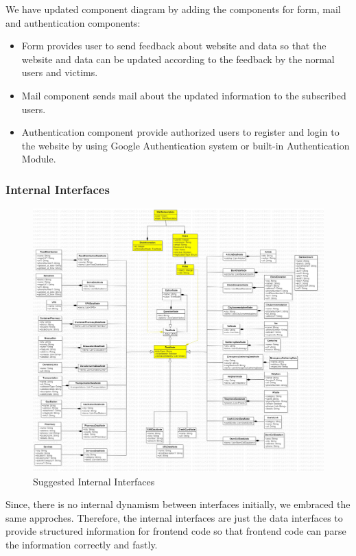 We have updated component diagram by adding the components for form, mail and authentication components:
\begin{itemize}
  \item Form provides user to send feedback about website and data so that the website and data can be updated according to the feedback by the normal users and victims.
  \item Mail component sends mail about the updated information to the subscribed users.
  \item Authentication component provide authorized users to register and login to the website by using Google Authentication system or built-in Authentication Module.
\end{itemize}

\subsubsection{Internal Interfaces}

\begin{figure}[H]
  \centering
  \includegraphics[width=\linewidth]{img/internal-interfaces-diagram-s5.jpg}
  \caption{Suggested Internal Interfaces}
\end{figure}


Since, there is no internal dynamism between interfaces initially, we embraced the same approches. Therefore, the internal interfaces are just the data interfaces to provide structured information for frontend code so that frontend code can parse the information correctly and fastly.

